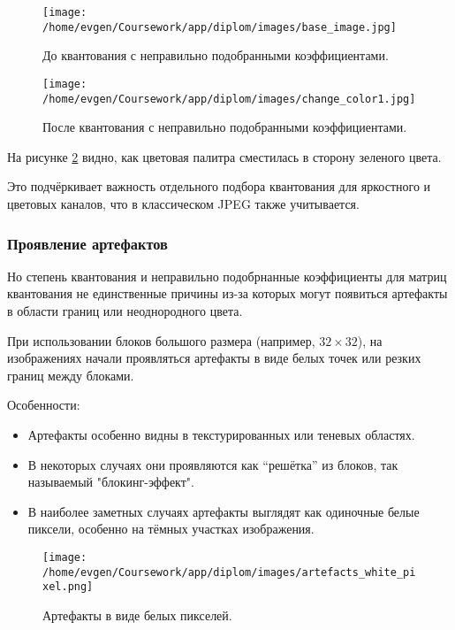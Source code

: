 \begin{figure}[H]
    \centering
    \texttt{[image: /home/evgen/Coursework/app/diplom/images/base\_image.jpg]}
    \caption{До квантования с неправильно подобранными коэффициентами.}
    \label{fig:base_image}
\end{figure}

 
\begin{figure}[H]
    \centering
    \texttt{[image: /home/evgen/Coursework/app/diplom/images/change\_color1.jpg]}
    \caption{После квантования с неправильно подобранными коэффициентами.}
    \label{fig:change_color}
\end{figure}

На рисунке \ref{fig:change_color} видно, как цветовая палитра сместилась в сторону зеленого цвета.

Это подчёркивает важность отдельного подбора квантования для яркостного и цветовых каналов, 
что в классическом JPEG также учитывается.


\subsubsection{Проявление артефактов}
Но степень квантования и неправильно подобрнанные коэффициенты для матриц квантования не единственные причины
из-за которых могут появиться артефакты в области границ или неоднородного цвета.

При использовании блоков большого размера (например, $32 \times 32$), 
на изображениях начали проявляться артефакты в виде белых точек или резких границ между блоками.

Особенности:
\begin{itemize}
    \item Артефакты особенно видны в текстурированных или теневых областях.
    \item В некоторых случаях они проявляются как “решётка” из блоков, так называемый "блокинг-эффект".
    \item В наиболее заметных случаях артефакты выглядят как одиночные белые пиксели, особенно на тёмных участках изображения.
\end{itemize}


\begin{figure}[H]
    \centering
    \texttt{[image: /home/evgen/Coursework/app/diplom/images/artefacts\_white\_pixel.png]}
    \caption{Артефакты в виде белых пикселей.}
    \label{fig:artefacts_white_pixel}
\end{figure}


